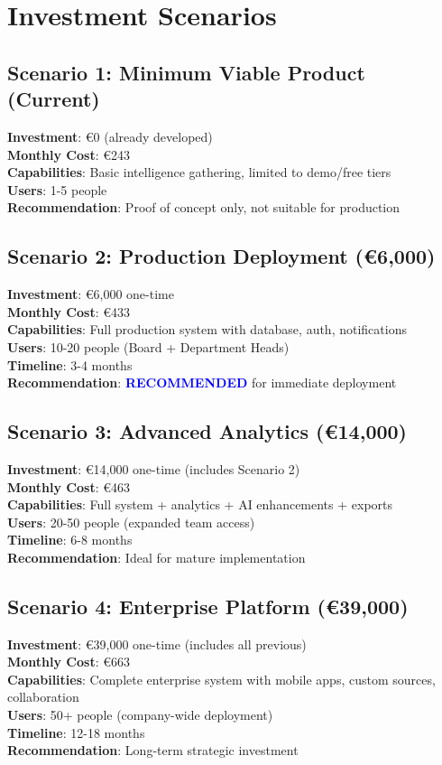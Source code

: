 \documentclass[11pt,a4paper]{article}
\begin{document}
\section{Investment Scenarios}

\subsection{Scenario 1: Minimum Viable Product (Current)}
\textbf{Investment}: \euro 0 (already developed)\\
\textbf{Monthly Cost}: \euro 243\\
\textbf{Capabilities}: Basic intelligence gathering, limited to demo/free tiers\\
\textbf{Users}: 1-5 people\\
\textbf{Recommendation}: Proof of concept only, not suitable for production

\subsection{Scenario 2: Production Deployment (\euro 6,000)}
\textbf{Investment}: \euro 6,000 one-time\\
\textbf{Monthly Cost}: \euro 433\\
\textbf{Capabilities}: Full production system with database, auth, notifications\\
\textbf{Users}: 10-20 people (Board + Department Heads)\\
\textbf{Timeline}: 3-4 months\\
\textbf{Recommendation}: \textcolor{blue}{\textbf{RECOMMENDED}} for immediate deployment

\subsection{Scenario 3: Advanced Analytics (\euro 14,000)}
\textbf{Investment}: \euro 14,000 one-time (includes Scenario 2)\\
\textbf{Monthly Cost}: \euro 463\\
\textbf{Capabilities}: Full system + analytics + AI enhancements + exports\\
\textbf{Users}: 20-50 people (expanded team access)\\
\textbf{Timeline}: 6-8 months\\
\textbf{Recommendation}: Ideal for mature implementation

\subsection{Scenario 4: Enterprise Platform (\euro 39,000)}
\textbf{Investment}: \euro 39,000 one-time (includes all previous)\\
\textbf{Monthly Cost}: \euro 663\\
\textbf{Capabilities}: Complete enterprise system with mobile apps, custom sources, collaboration\\
\textbf{Users}: 50+ people (company-wide deployment)\\
\textbf{Timeline}: 12-18 months\\
\textbf{Recommendation}: Long-term strategic investment
\end{document}
